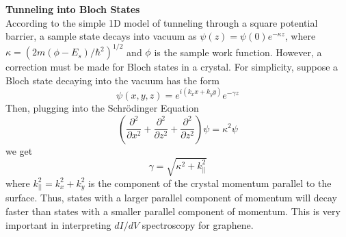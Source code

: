 \documentclass[a4paper,12pt]{article}
\begin{document}
\textbf{Tunneling into Bloch States} \\

According to the simple 1D model of tunneling through a square potential barrier, a sample state decays into vacuum as $\psi(z)=\psi(0) e^{-\kappa z}$, where $\kappa=(2m(\phi-E_s)/\hbar^2)^{1/2}$ and $\phi$ is the sample work function.  However, a correction must be made for Bloch states in a crystal.  For simplicity, suppose a Bloch state decaying into the vacuum has the form
\begin{equation}
\psi(x,y,z)=e^{i(k_x x + k_y y)} e^{-\gamma z}
\end{equation}
Then, plugging into the Schr\"{o}dinger Equation
\begin{equation}
\left( \frac{\partial^2}{\partial x^2}+\frac{\partial^2}{\partial z^2}+\frac{\partial^2}{\partial z^2} \right)\psi=\kappa^2 \psi
\end{equation}
we get
\begin{equation}
\gamma = \sqrt{\kappa^2 +k_{||}^2}
\end{equation}
where $k_{||}^2=k_x^2+k_y^2$ is the component of the crystal momentum parallel to the surface.  Thus, states with a larger parallel component of momentum will decay faster than states with a smaller parallel component of momentum.  This is very important in interpreting $dI/dV$ spectroscopy for graphene.
\end{document}
